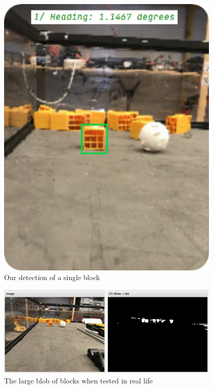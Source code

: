 \begin{figure}[htp]
\centering
\includegraphics[width=0.95\textwidth, angle=0]{Meetings/February/02-10-22/02-10-22 1.PNG}
\caption{Our detection of a single block}
\label{fig:021022_1}
\end{figure}

\begin{figure}[htp]
\centering
\includegraphics[width=0.95\textwidth, angle=0]{Meetings/February/02-10-22/02-10-22 2.PNG}
\caption{The large blob of blocks when tested in real life}
\label{fig:021022_2}
\end{figure}

